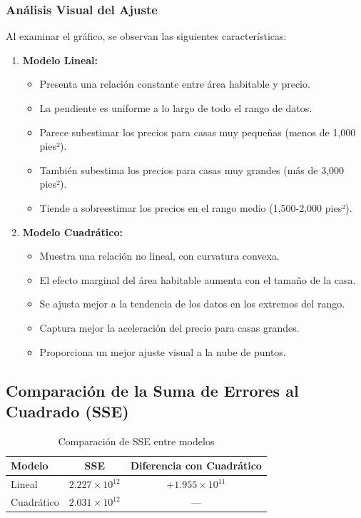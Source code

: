\documentclass[12pt]{article}
\begin{document}
\subsubsection*{Análisis Visual del Ajuste}

Al examinar el gráfico, se observan las siguientes características:

\begin{enumerate}
    \item \textbf{Modelo Lineal:} 
    \begin{itemize}
        \item Presenta una relación constante entre área habitable y precio.
        \item La pendiente es uniforme a lo largo de todo el rango de datos.
        \item Parece subestimar los precios para casas muy pequeñas (menos de 1,000 pies²).
        \item También subestima los precios para casas muy grandes (más de 3,000 pies²).
        \item Tiende a sobreestimar los precios en el rango medio (1,500-2,000 pies²).
    \end{itemize}
    
    \item \textbf{Modelo Cuadrático:}
    \begin{itemize}
        \item Muestra una relación no lineal, con curvatura convexa.
        \item El efecto marginal del área habitable aumenta con el tamaño de la casa.
        \item Se ajusta mejor a la tendencia de los datos en los extremos del rango.
        \item Captura mejor la aceleración del precio para casas grandes.
        \item Proporciona un mejor ajuste visual a la nube de puntos.
    \end{itemize}
\end{enumerate}

\subsection*{Comparación de la Suma de Errores al Cuadrado (SSE)}

\begin{table}[h]
\centering
\begin{tabular}{lcc}
\hline
\textbf{Modelo} & \textbf{SSE} & \textbf{Diferencia con Cuadrático} \\
\hline
Lineal & $2.227 \times 10^{12}$ & $+1.955 \times 10^{11}$ \\
Cuadrático & $2.031 \times 10^{12}$ & --- \\
\hline
\end{tabular}
\caption{Comparación de SSE entre modelos}
\label{tab:sse_comparison}
\end{table}
\end{document}
